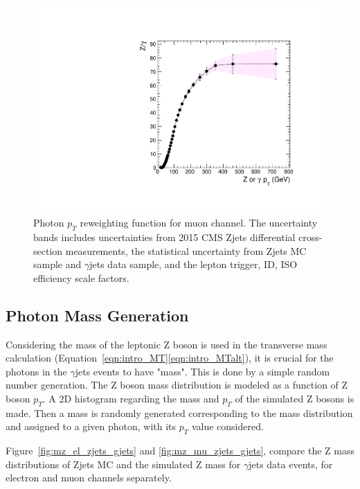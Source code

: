 \begin{figure}[htbp]
\centering
  \includegraphics[width=0.9\linewidth]{figures/study_gjets_data_allcorV2_modify_mu.pdf}
  \caption{Photon $p_T$ reweighting function for muon channel.
 The uncertainty bands includes uncertainties from 2015 CMS Zjets differential cross-section measurements, the statistical uncertainty from Zjets MC sample and $\gamma$jets data sample, and the lepton trigger, ID, ISO efficiency scale factors.}
  \label{fig:photon_pt_weight_mu}
\end{figure}

\subsection{Photon Mass Generation}
Considering the mass of the leptonic Z boson is used in the transverse mass calculation (Equation~\ref{eqn:intro_MT}\ref{eqn:intro_MTalt}), it is crucial for the photons in the $\gamma$jets events to have "mass". This is done by a simple random number generation. The Z boson mass distribution is modeled as a function of Z boson $p_T$. A 2D histogram regarding the mass and $p_T$ of the simulated Z bosons is made. Then a mass is randomly generated corresponding to the mass distribution and assigned to a given photon, with its $p_T$ value considered.

\vspace{0.3cm}
Figure~\ref{fig:mz_el_zjets_gjets} and \ref{fig:mz_mu_zjets_gjets}, compare the Z mass distributions of Zjets MC and the simulated Z mass for $\gamma$jets data events, for electron and muon channels separately.


